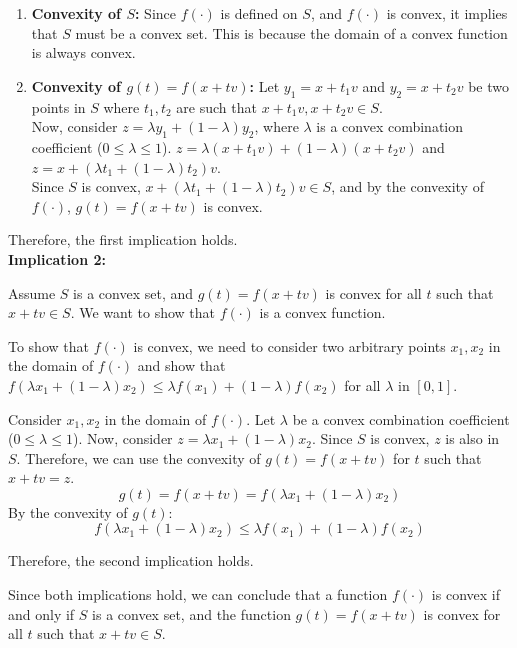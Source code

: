 \documentclass[12pt]{article}
\begin{document}
\begin{enumerate}
    \item \textbf{Convexity of \( S \):} Since \( f(·) \) is defined on \( S \), and \( f(·) \) is convex, it implies that \( S \) must be a convex set. This is because the domain of a convex function is always convex.
    
    \item \textbf{Convexity of \( g(t) = f(x + tv) \):} Let \( y_1 = x + t_1v \) and \( y_2 = x + t_2v \) be two points in \( S \) where \( t_1, t_2 \) are such that \( x + t_1v, x + t_2v \in S \). \\
    Now, consider \( z = \lambda y_1 + (1 - \lambda) y_2 \), where \( \lambda \) is a convex combination coefficient (\( 0 \leq \lambda \leq 1 \)). \( z = \lambda (x + t_1v) + (1 - \lambda)(x + t_2v) \) and \( z = x + (\lambda t_1 + (1 - \lambda)t_2)v \). \\
    Since \( S \) is convex, \( x + (\lambda t_1 + (1 - \lambda)t_2)v \in S \), and by the convexity of \( f(·) \), \( g(t) = f(x + tv) \) is convex.
\end{enumerate}

Therefore, the first implication holds. \\

\textbf{Implication 2:}

Assume \( S \) is a convex set, and \( g(t) = f(x + tv) \) is convex for all \( t \) such that \( x + tv \in S \). We want to show that \( f(·) \) is a convex function.

To show that \( f(·) \) is convex, we need to consider two arbitrary points \( x_1, x_2 \) in the domain of \( f(·) \) and show that \( f(\lambda x_1 + (1 - \lambda) x_2) \leq \lambda f(x_1) + (1 - \lambda) f(x_2) \) for all \( \lambda \) in \([0, 1]\).

Consider \( x_1, x_2 \) in the domain of \( f(·) \). Let \( \lambda \) be a convex combination coefficient (\( 0 \leq \lambda \leq 1 \)). Now, consider \( z = \lambda x_1 + (1 - \lambda) x_2 \). Since \( S \) is convex, \( z \) is also in \( S \). Therefore, we can use the convexity of \( g(t) = f(x + tv) \) for \( t \) such that \( x + tv = z \).
\[ g(t) = f(x + tv) = f(\lambda x_1 + (1 - \lambda) x_2) \]
By the convexity of \( g(t) \):
\[ f(\lambda x_1 + (1 - \lambda) x_2) \leq \lambda f(x_1) + (1 - \lambda) f(x_2) \]

Therefore, the second implication holds.

Since both implications hold, we can conclude that a function \( f(·) \) is convex if and only if \( S \) is a convex set, and the function \( g(t) = f(x + tv) \) is convex for all \( t \) such that \( x + tv \in S \).
\end{document}
